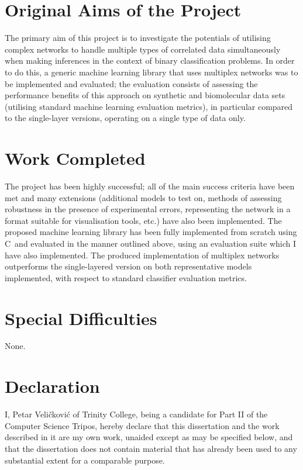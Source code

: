 \documentclass[12pt,a4paper,twoside,openright]{report}
\def\CC{{C\nolinebreak[4]\hspace{-.05em}\raisebox{.4ex}{\tiny\bf ++}}}
\begin{document}
\section*{Original Aims of the Project}

The primary aim of this project is to investigate the potentials of utilising complex networks to handle multiple types of correlated data simultaneously when making inferences in the context of binary classification problems. In order to do this, a generic machine learning library that uses multiplex networks was to be implemented and evaluated; the evaluation consists of assessing the performance benefits of this approach on synthetic and biomolecular data sets (utilising standard machine learning evaluation metrics), in particular compared to the single-layer versions, operating on a single type of data only.

\section*{Work Completed}

The project has been highly successful; all of the main success criteria have been met and many extensions (additional models to test on, methods of assessing robustness in the presence of experimental errors, representing the network in a format suitable for visualisation tools, etc.) have also been implemented. The proposed machine learning library has been fully implemented from scratch using \CC\ and evaluated in the manner outlined above, using an evaluation suite which I have also implemented. The produced implementation of multiplex networks outperforms the single-layered version on both representative models implemented, with respect to standard classifier evaluation metrics.

\section*{Special Difficulties}

None.

\section*{Declaration}

I, Petar Veli\v{c}kovi\'{c} of Trinity College, being a candidate for Part II of the Computer
Science Tripos, hereby declare
that this dissertation and the work described in it are my own work,
unaided except as may be specified below, and that the dissertation
does not contain material that has already been used to any substantial
extent for a comparable purpose.
\end{document}
